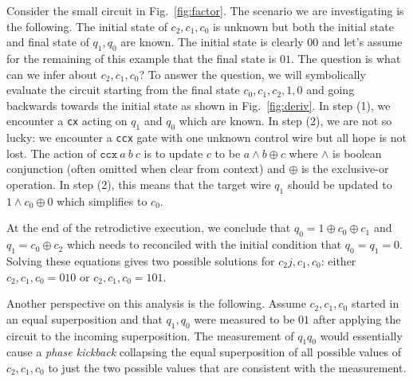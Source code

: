 \documentclass{article}
\begin{document}
Consider the small circuit in Fig.~\ref{fig:factor}. The scenario we
are investigating is the following. The initial state of $c_2,c_1,c_0$
is unknown but both the initial state and final state of $q_1,q_0$ are
known. The initial state is clearly $00$ and let's assume for the
remaining of this example that the final state is $01$. The question
is what can we infer about $c_2,c_1,c_0$? To answer the question, we
will symbolically evaluate the circuit starting from the final state
$c_0,c_1,c_2,1,0$ and going backwards towards the initial state as
shown in Fig.~\ref{fig:deriv}. In step (1), we encounter a \texttt{cx}
acting on $q_1$ and $q_0$ which are known. In step (2), we are not so
lucky: we encounter a \texttt{ccx} gate with one unknown control wire
but all hope is not lost. The action of $\texttt{ccx}~a~b~c$ is to
update $c$ to be $a \wedge b \oplus c$ where $\wedge$ is boolean
conjunction (often omitted when clear from context) and $\oplus$ is
the exclusive-or operation. In step (2), this means that the target
wire $q_1$ should be updated to $1 \wedge c_0 \oplus 0$ which
simplifies to $c_0$.

At the end of the retrodictive execution, we conclude that $q_0 = 1
\oplus c_0 \oplus c_1$ and $q_1 = c_0 \oplus c_2$ which needs to
reconciled with the initial condition that $q_0 = q_1 = 0$. Solving
these equations gives two possible solutions for $c_2j,c_1,c_0$:
either $c_2,c_1,c_0 = 010$ or $c_2,c_1,c_0 = 101$.

Another perspective on this analysis is the following. Assume
$c_2,c_1,c_0$ started in an equal superposition and that $q_1,q_0$
were measured to be $01$ after applying the circuit to the incoming
superposition. The measurement of $q_1q_0$ would essentially cause a
\emph{phase kickback} collapsing the equal superposition of all
possible values of $c_2,c_1,c_0$ to just the two possible values that
are consistent with the measurement.
\end{document}
